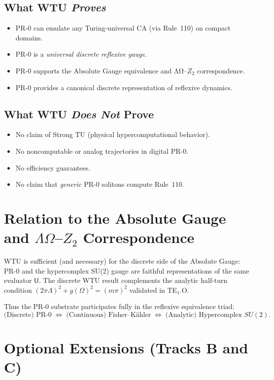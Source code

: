 \subsection{What WTU \emph{Proves}}
\begin{itemize}
\item PR-0 can emulate any Turing-universal CA (via Rule~110) on compact domains.
\item PR-0 is a \emph{universal discrete reflexive gauge}.
\item PR-0 supports the Absolute Gauge equivalence and ΛΩ--$Z_2$ correspondence.
\item PR-0 provides a canonical discrete representation of reflexive dynamics.
\end{itemize}

\subsection{What WTU \emph{Does Not} Prove}
\begin{itemize}
\item No claim of Strong TU (physical hypercomputational behavior).
\item No noncomputable or analog trajectories in digital PR-0.
\item No efficiency guarantees.
\item No claim that \emph{generic} PR-0 solitons compute Rule~110.
\end{itemize}

\section{Relation to the Absolute Gauge and $\Lambda\Omega$--$Z_2$ Correspondence}

WTU is sufficient (and necessary) for the discrete side of the Absolute Gauge:
PR-0 and the hypercomplex SU(2) gauge are faithful representations of the same evaluator
$\mathsf{U}$.
The discrete WTU result complements the analytic half-turn condition
$(2\pi\Lambda)^2+g(\Omega)^2 = (m\pi)^2$ validated in TE$_1$.O.

Thus the PR-0 substrate participates fully in the reflexive equivalence triad:
\[
\text{(Discrete) PR-0}
\;\Longleftrightarrow\;
\text{(Continuous) Fisher--K\"ahler}
\;\Longleftrightarrow\;
\text{(Analytic) Hypercomplex }SU(2).
\]

\section{Optional Extensions (Tracks B and C)}

